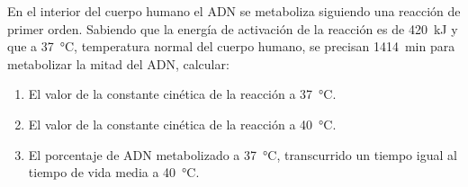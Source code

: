 En el interior del cuerpo humano el \ac{ADN} se metaboliza siguiendo una reacción de primer orden. Sabiendo que la energía de activación de la reacción es de \SI{420}{\kilo\joule} y que a \SI{37}{\celsius}, temperatura normal del cuerpo humano, se precisan \SI{1414}{\minute} para metabolizar la mitad del \ac{ADN}, calcular:
\begin{enumerate}[label={\alph*)},font={\color{red!50!black}\bfseries}]
    \item El valor de la constante cinética de la reacción a \SI{37}{\celsius}.
    \item El valor de la constante cinética de la reacción a \SI{40}{\celsius}.
    \item El porcentaje de \ac{ADN} metabolizado a \SI{37}{\celsius}, transcurrido un tiempo igual al tiempo
    de vida media a \SI{40}{\celsius}.
\end{enumerate}
